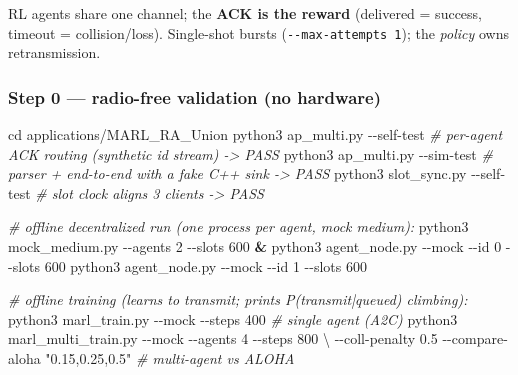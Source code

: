 \documentclass[
  9.5pt,
]{article}
\newenvironment{Shaded}{\begin{snugshade}}{\end{snugshade}}
\newcommand{\AttributeTok}[1]{\textcolor[rgb]{0.77,0.63,0.00}{#1}}
\newcommand{\BuiltInTok}[1]{#1}
\newcommand{\CommentTok}[1]{\textcolor[rgb]{0.56,0.35,0.01}{\textit{#1}}}
\newcommand{\DataTypeTok}[1]{\textcolor[rgb]{0.13,0.29,0.53}{#1}}
\newcommand{\ExtensionTok}[1]{#1}
\newcommand{\KeywordTok}[1]{\textcolor[rgb]{0.13,0.29,0.53}{\textbf{#1}}}
\newcommand{\NormalTok}[1]{#1}
\newcommand{\StringTok}[1]{\textcolor[rgb]{0.31,0.60,0.02}{#1}}
\begin{document}
RL agents share one channel; the \textbf{ACK is the reward} (delivered =
success, timeout = collision/loss). Single-shot bursts
(\texttt{-\/-max-attempts\ 1}); the \emph{policy} owns retransmission.

\hypertarget{step-0--radio-free-validation-no-hardware}{%
\subsubsection{Step 0 --- radio-free validation (no
hardware)}\label{step-0--radio-free-validation-no-hardware}}

\begin{Shaded}
\begin{Highlighting}[]
\BuiltInTok{cd}\NormalTok{ applications/MARL\_RA\_Union}
\ExtensionTok{python3}\NormalTok{ ap\_multi.py }\AttributeTok{{-}{-}self{-}test}      \CommentTok{\# per{-}agent ACK routing (synthetic id stream)  {-}\textgreater{} PASS}
\ExtensionTok{python3}\NormalTok{ ap\_multi.py }\AttributeTok{{-}{-}sim{-}test}       \CommentTok{\# parser + end{-}to{-}end with a fake C++ sink       {-}\textgreater{} PASS}
\ExtensionTok{python3}\NormalTok{ slot\_sync.py }\AttributeTok{{-}{-}self{-}test}     \CommentTok{\# slot clock aligns 3 clients                     {-}\textgreater{} PASS}

\CommentTok{\# offline decentralized run (one process per agent, mock medium):}
\ExtensionTok{python3}\NormalTok{ mock\_medium.py }\AttributeTok{{-}{-}agents}\NormalTok{ 2 }\AttributeTok{{-}{-}slots}\NormalTok{ 600 }\KeywordTok{\&}
\ExtensionTok{python3}\NormalTok{ agent\_node.py }\AttributeTok{{-}{-}mock} \AttributeTok{{-}{-}id}\NormalTok{ 0 }\AttributeTok{{-}{-}slots}\NormalTok{ 600}
\ExtensionTok{python3}\NormalTok{ agent\_node.py }\AttributeTok{{-}{-}mock} \AttributeTok{{-}{-}id}\NormalTok{ 1 }\AttributeTok{{-}{-}slots}\NormalTok{ 600}

\CommentTok{\# offline training (learns to transmit; prints P(transmit|queued) climbing):}
\ExtensionTok{python3}\NormalTok{ marl\_train.py }\AttributeTok{{-}{-}mock} \AttributeTok{{-}{-}steps}\NormalTok{ 400                       }\CommentTok{\# single agent (A2C)}
\ExtensionTok{python3}\NormalTok{ marl\_multi\_train.py }\AttributeTok{{-}{-}mock} \AttributeTok{{-}{-}agents}\NormalTok{ 4 }\AttributeTok{{-}{-}steps}\NormalTok{ 800 }\DataTypeTok{\textbackslash{}}
        \AttributeTok{{-}{-}coll{-}penalty}\NormalTok{ 0.5 }\AttributeTok{{-}{-}compare{-}aloha} \StringTok{"0.15,0.25,0.5"}     \CommentTok{\# multi{-}agent vs ALOHA}
\end{Highlighting}
\end{Shaded}
\end{document}
